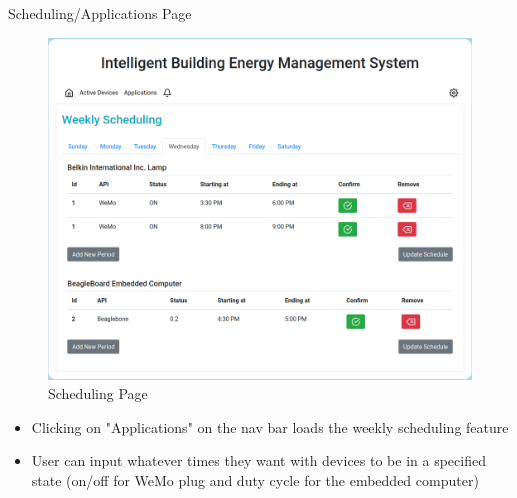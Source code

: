 \documentclass{beamer}
\begin{document}
\begin{frame}{Scheduling/Applications Page}{} %

    \begin{multicols}{2}
        \begin{figure}
            \centering
            \includegraphics[scale=0.15]{figs/Applications_screen.png}
            \caption{Scheduling Page}
            \label{fig:schedulingl}
        \end{figure}
        \textsc{}
        \begin{itemize}
            \item Clicking on "Applications" on the nav bar loads the weekly scheduling feature
            \item User can input whatever times they want with devices to be in a specified state (on/off for WeMo plug and duty cycle for the embedded computer)
        \end{itemize}
    \end{multicols}
\end{frame}
\end{document}
